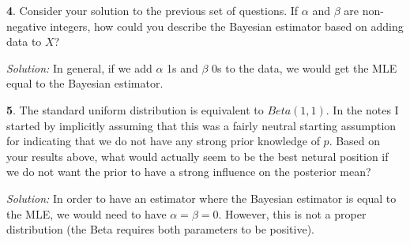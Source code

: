 \documentclass{tufte-handout}
\begin{document}
\textbf{4}. Consider your solution to the previous set of questions. If $\alpha$ and $\beta$
are non-negative integers, how could you describe the Bayesian estimator based
on adding data to $X$? 

\textit{Solution:} In general, if we add $\alpha$ 1s and $\beta$ 0s to the data, we would get the
MLE equal to the Bayesian estimator.

\textbf{5}. The standard uniform distribution is equivalent to $Beta(1, 1)$. In the notes
I started by implicitly assuming that this was a fairly neutral starting
assumption for indicating that we do not have any strong prior knowledge of
$p$. Based on your results above, what would actually seem to be the best
netural position if we do not want the prior to have a strong influence on 
the posterior mean?

\textit{Solution:} In order to have an estimator where the Bayesian estimator is equal to the MLE,
we would need to have $\alpha = \beta = 0$. However, this is not a proper
distribution (the Beta requires both parameters to be positive).
\end{document}
